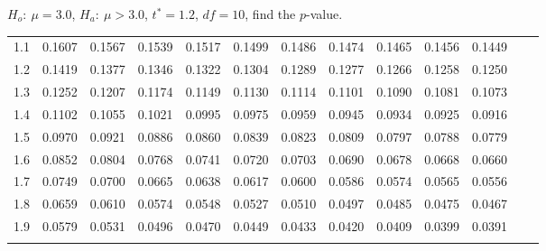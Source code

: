 \begin{frame}{\small $H_o:~\mu=3.0$, $H_a:~\mu>3.0$, $t^*=1.2$,
    $df=10$, find the $p$-value.}
{\begin{tabular}{l|lllll>{\columncolor{light-blue}}lllllll}
 1.1 & 0.1607 & 0.1567 & 0.1539 & 0.1517 & 0.1499 & 0.1486 & 0.1474 & 0.1465 & 0.1456 & 0.1449  \\[5pt] \arrayrulecolor{light-gray}\hline\arrayrulecolor{black}  
\rowcolor{light-red} 1.2 & 0.1419 & 0.1377 & 0.1346 & 0.1322 & 0.1304 & 0.1289 & 0.1277 & 0.1266 & 0.1258 & 0.1250  \\[5pt] \arrayrulecolor{light-gray}\hline\arrayrulecolor{black}  
 1.3 & 0.1252 & 0.1207 & 0.1174 & 0.1149 & 0.1130 & 0.1114 & 0.1101 & 0.1090 & 0.1081 & 0.1073  \\[5pt] \arrayrulecolor{light-gray}\hline\arrayrulecolor{black}  
 1.4 & 0.1102 & 0.1055 & 0.1021 & 0.0995 & 0.0975 & 0.0959 & 0.0945 & 0.0934 & 0.0925 & 0.0916  \\[5pt] \arrayrulecolor{light-gray}\hline\arrayrulecolor{black}  
 1.5 & 0.0970 & 0.0921 & 0.0886 & 0.0860 & 0.0839 & 0.0823 & 0.0809 & 0.0797 & 0.0788 & 0.0779  \\[5pt] \arrayrulecolor{light-gray}\hline\arrayrulecolor{black}  
 1.6 & 0.0852 & 0.0804 & 0.0768 & 0.0741 & 0.0720 & 0.0703 & 0.0690 & 0.0678 & 0.0668 & 0.0660  \\[5pt] \arrayrulecolor{light-gray}\hline\arrayrulecolor{black}  
 1.7 & 0.0749 & 0.0700 & 0.0665 & 0.0638 & 0.0617 & 0.0600 & 0.0586 & 0.0574 & 0.0565 & 0.0556  \\[5pt] \arrayrulecolor{light-gray}\hline\arrayrulecolor{black}  
 1.8 & 0.0659 & 0.0610 & 0.0574 & 0.0548 & 0.0527 & 0.0510 & 0.0497 & 0.0485 & 0.0475 & 0.0467  \\[5pt] \arrayrulecolor{light-gray}\hline\arrayrulecolor{black}  
 1.9 & 0.0579 & 0.0531 & 0.0496 & 0.0470 & 0.0449 & 0.0433 & 0.0420 & 0.0409 & 0.0399 & 0.0391  \\[5pt] \arrayrulecolor{light-gray}\hline\arrayrulecolor{black}  
\end{tabular}

}

\end{frame}



